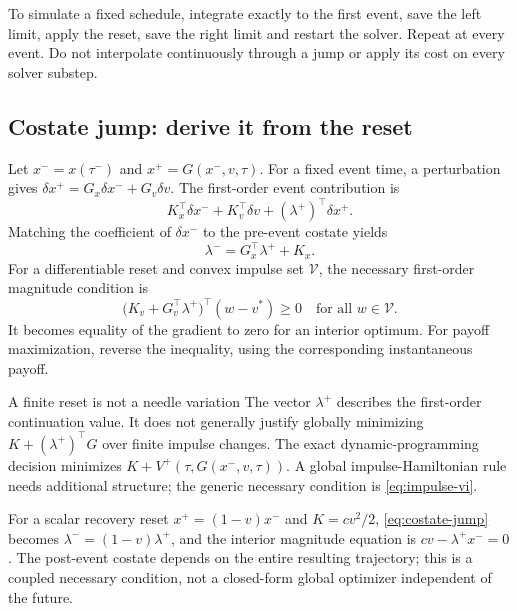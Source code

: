 \documentclass[11pt,a4paper]{article}
\theoremstyle{definition}
\theoremstyle{remark}
\begin{document}
To simulate a fixed schedule, integrate exactly to the first event, save the left limit, apply the reset, save the right limit and restart the solver. Repeat at every event. Do not interpolate continuously through a jump or apply its cost on every solver substep.

\begin{center}
\end{center}

\subsection{Costate jump: derive it from the reset}
Let $x^-=x(\tau^-)$ and $x^+=G(x^-,v,\tau)$. For a fixed event time, a perturbation gives
$\delta x^+=G_x\delta x^-+G_v\delta v$. The first-order event contribution is
\[
K_x^\top\delta x^-+K_v^\top\delta v+(\lambda^+)^\top\delta x^+.
\]
Matching the coefficient of $\delta x^-$ to the pre-event costate yields
\begin{equation}
\boxed{\lambda^-=G_x^\top\lambda^++K_x.}
\label{eq:costate-jump}
\end{equation}
For a differentiable reset and convex impulse set $\mathcal V$, the necessary first-order magnitude condition is
\begin{equation}
\big(K_v+G_v^\top\lambda^+\big)^\top(w-v^*)\ge0
\quad\text{for all }w\in\mathcal V.
\label{eq:impulse-vi}
\end{equation}
It becomes equality of the gradient to zero for an interior optimum. For payoff maximization, reverse the inequality, using the corresponding instantaneous payoff.

\begin{keyidea}{A finite reset is not a needle variation}
The vector $\lambda^+$ describes the first-order continuation value. It does not generally justify globally minimizing $K+(\lambda^+)^\top G$ over finite impulse changes. The exact dynamic-programming decision minimizes $K+V^+(\tau,G(x^-,v,\tau))$. A global impulse-Hamiltonian rule needs additional structure; the generic necessary condition is \eqref{eq:impulse-vi}.
\end{keyidea}
For a scalar recovery reset $x^+=(1-v)x^-$ and $K=cv^2/2$, \eqref{eq:costate-jump} becomes $\lambda^-=(1-v)\lambda^+$, and the interior magnitude equation is $cv-\lambda^+x^-=0$. The post-event costate depends on the entire resulting trajectory; this is a coupled necessary condition, not a closed-form global optimizer independent of the future.
\end{document}
